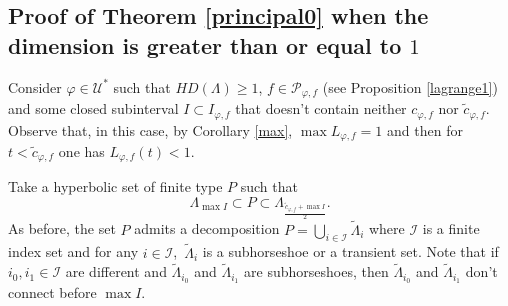 \documentclass[12pt]{amsart}
\theoremstyle{plain} %
\theoremstyle{definition} %
\numberwithin{equation}{section}
\begin{document}
\subsection{Proof of Theorem \ref{principal0} when the dimension is greater than or equal to $1$}

Consider $\varphi\in \mathcal{U}^*$ such that $HD(\Lambda)\geq 1$, $f\in \mathcal{P}_{\varphi,f}$ (see Proposition \ref{lagrange1}) and some closed subinterval $I\subset I_{\varphi,f}$ that doesn't contain neither $c_{\varphi,f}$ nor $\tilde{c}_{\varphi,f}$. Observe  that, in this case, by Corollary \ref{max}, $\max L_{\varphi, f}=1$ and then for $t<\tilde{c}_{\varphi,f}$ one has $L_{\varphi, f}(t)<1$. 

Take a hyperbolic set of finite type $P$ such that $$\Lambda_{\max I} \subset P\subset \Lambda_{\frac{\tilde{c}_{\varphi,f}+\max I}{2}}.$$
As before, the set $P$ admits a decomposition $P=\bigcup \limits_{i\in \mathcal{I}} \tilde{\Lambda}_i$ where $\mathcal{I}$ is a finite index set and for any $i\in \mathcal{I}$,\ $\tilde{\Lambda}_i$ is a subhorseshoe or a transient set. Note that if $i_0,i_1\in\mathcal{I}$ are different and $\tilde{\Lambda}_{i_0}$ and $\tilde{\Lambda}_{i_1}$ are subhorseshoes, then $\tilde{\Lambda}_{i_0}$ and $\tilde{\Lambda}_{i_1}$ don't connect before $\max I$.
\end{document}
